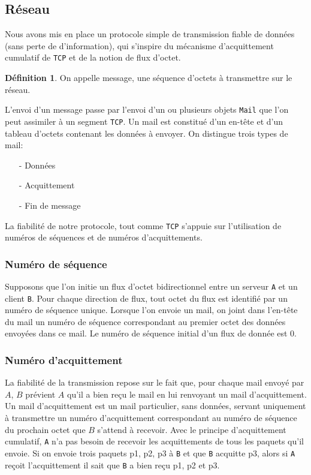 \documentclass[11pt]{article}
\theoremstyle{definition}
\theoremstyle{definition}
\newtheorem*{myDef}{Définition}
\begin{document}
\subsection{Réseau}
Nous avons mis en place un protocole simple de transmission fiable de données (sans perte de d'information), qui s'inspire du mécanisme d'acquittement cumulatif de \texttt{TCP} et de la notion de flux d'octet.
\begin{myDef}
  On appelle message, une séquence d'octets à transmettre sur le réseau.
\end{myDef}
L'envoi d'un message passe par l'envoi d'un ou plusieurs objets \texttt{Mail} que l'on peut assimiler à un segment \texttt{TCP}. 
Un mail est constitué d'un en-tête et d'un tableau d'octets contenant les données à envoyer.
On distingue trois types de mail:
\begin{itemize}
\item[-]Données
\item[-]Acquittement
\item[-]Fin de message
\end{itemize}
La fiabilité de notre protocole, tout comme \texttt{TCP} s'appuie sur l'utilisation de numéros de séquences et de numéros d'acquittements.

\subsubsection{Numéro de séquence}
Supposons que l'on initie un flux d'octet bidirectionnel entre un serveur \texttt{A} et un client \texttt{B}.
Pour chaque direction de flux, tout octet du flux est identifié par un numéro de séquence unique. 
Lorsque l'on envoie un mail, on joint dans l'en-tête du mail un numéro de séquence correspondant
au premier octet des données envoyées dans ce mail. Le numéro de séquence initial d'un flux de donnée est $0$.

\subsubsection{Numéro d'acquittement}
La fiabilité de la transmission repose sur le fait que, pour chaque mail envoyé par $A$, $B$ prévient $A$ qu'il a bien reçu le mail en lui renvoyant un mail d'acquittement.
Un mail d'acquittement est un mail particulier, sans données, servant uniquement à transmettre un numéro d'acquittement correspondant au numéro de séquence du prochain octet que $B$ s'attend à recevoir.
Avec le principe d'acquittement cumulatif, \texttt{A} n'a pas besoin de recevoir les acquittements de tous les paquets qu'il envoie. Si on envoie trois paquets p1, p2, p3 à \texttt{B} et que \texttt{B}
acquitte p3, alors si \texttt{A} reçoit l'acquittement il sait que \texttt{B} a bien reçu p1, p2 et p3.
\end{document}

